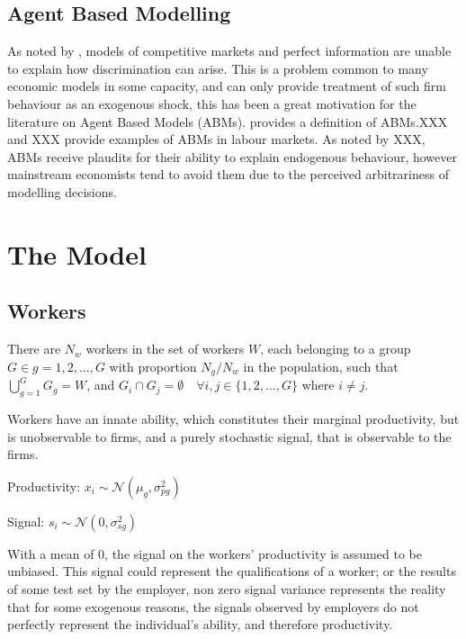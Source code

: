 \documentclass[]{article}
\begin{document}
\subsection{Agent Based Modelling}

As noted by \citet{LunderbergStartz1983}, models of competitive markets and perfect information are unable to explain how discrimination can arise. This is a problem common to many economic models in some capacity, and can only provide treatment of such firm behaviour as an exogenous shock, this has been a great motivation for the literature on Agent Based Models (ABMs). \citet{PangalloDelRioChanona2024} provides a definition of ABMs.XXX and XXX provide examples of ABMs in labour markets. As noted by XXX, ABMs receive plaudits for their ability to explain endogenous behaviour, however mainstream economists tend to avoid them due to the perceived arbitrariness of modelling decisions. 


\newpage
\section{The Model}

\subsection{Workers}
There are $N_w$ workers in the set of workers $W$, each belonging to a group $G \in g = 1, 2, ..., G$ with proportion $N_g / N_w$ in the population, such that $\bigcup_{g=1}^{G} G_g = W$, and $G_i \cap G_j = \emptyset \quad \forall i, j \in \{1, 2, \dots, G\}$ where $ i \neq j$. 

\vspace{0.1cm}

Workers have an innate ability, which constitutes their marginal productivity, but is unobservable to firms, and a purely stochastic signal, that is observable to the firms. 

\begin{center}
Productivity: $x_i \sim \mathcal{N}(\mu_g, \sigma_{pg}^2)$
	
	\vspace*{0.2cm}
	
	Signal: $ s_i \sim \mathcal{N}(0, \sigma_{sg}^2)$
\end{center}
With a mean of 0, the signal on the workers' productivity is assumed to be unbiased. This signal could represent the qualifications of a worker; or the results of some test set by the employer, non zero signal variance represents the reality that for some exogenous reasons, the signals observed by employers do not perfectly represent the individual's ability, and therefore productivity. 
\end{document}
